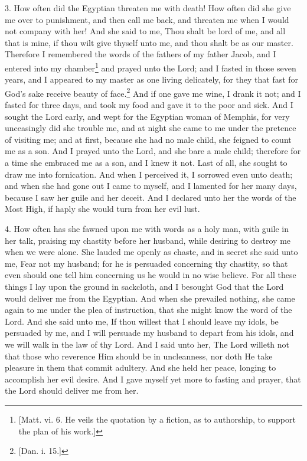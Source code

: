 3. How often did the Egyptian threaten me with death! How often did she give me over to punishment, and then call me back, and threaten me when I would not company with her! And she said to me, Thou shalt be lord of me, and all that is mine, if thou wilt give thyself unto me, and thou shalt be as our master. Therefore I remembered the words of the fathers of my father Jacob, and I entered into my chamber\footnote{[Matt. vi. 6. He veils the quotation by a fiction, as to authorship, to support the plan of his work.]} and prayed unto the Lord; and I fasted in those seven years, and I appeared to my master as one living delicately, for they that fast for God’s sake receive beauty of face.\footnote{[Dan. i. 15.]} And if one gave me wine, I drank it not; and I fasted for three days, and took my food and gave it to the poor and sick. And I sought the Lord early, and wept for the Egyptian woman of Memphis, for very unceasingly did she trouble me, and at night she came to me under the pretence of visiting me; and at first, because she had no male child, she feigned to count me as a son. And I prayed unto the Lord, and she bare a male child; therefore for a time she embraced me as a son, and I knew it not. Last of all, she sought to draw me into fornication. And when I perceived it, I sorrowed even unto death; and when she had gone out I came to myself, and I lamented for her many days, because I saw her guile and her deceit. And I declared unto her the words of the Most High, if haply she would turn from her evil lust.

4. How often has she fawned upon me with words as a holy man, with guile in her talk, praising my chastity before her husband, while desiring to destroy me when we were alone. She lauded me openly as chaste, and in secret she said unto me, Fear not my husband; for he is persuaded concerning thy chastity, so that even should one tell him concerning us he would in no wise believe. For all these things I lay upon the ground in sackcloth, and I besought God that the Lord would deliver me from the Egyptian. And when she prevailed nothing, she came again to me under the plea of instruction, that she might know the word of the Lord. And she said unto me, If thou willest that I should leave my idols, be persuaded by me, and I will persuade my husband to depart from his idols, and we will walk in the law of thy Lord. And I said unto her, The Lord willeth not that those who reverence Him should be in uncleanness, nor doth He take pleasure in them that commit adultery. And she held her peace, longing to accomplish her evil desire. And I gave myself yet more to fasting and prayer, that the Lord should deliver me from her.

